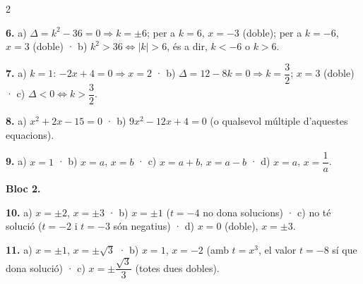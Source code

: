 \documentclass[13pt,a4paper]{extarticle}
\begin{document}
\begin{multicols}{2}
\begin{minipage}{\linewidth}
\textbf{6.} a) $\Delta=k^2-36=0 \Rightarrow k=\pm6$; per a $k=6$, $x=-3$ (doble); per a $k=-6$, $x=3$ (doble) · b) $k^2>36 \Leftrightarrow |k|>6$, és a dir, $k<-6$ o $k>6$.\par
\end{minipage}\par\vspace{1.6mm}
\par\noindent\begin{minipage}{\linewidth}
\textbf{7.} a) $k=1$: $-2x+4=0 \Rightarrow x=2$ · b) $\Delta=12-8k=0 \Rightarrow k=\dfrac32$; $x=3$ (doble) · c) $\Delta<0 \Leftrightarrow k>\dfrac32$.\par
\end{minipage}\par\vspace{1.6mm}
\par\noindent\begin{minipage}{\linewidth}
\textbf{8.} a) $x^2+2x-15=0$ · b) $9x^2-12x+4=0$ (o qualsevol múltiple d'aquestes equacions).\par
\end{minipage}\par\vspace{1.6mm}
\par\noindent\begin{minipage}{\linewidth}
\textbf{9.} a) $x=1$ · b) $x=a$, $x=b$ · c) $x=a+b$, $x=a-b$ · d) $x=a$, $x=\dfrac1a$.\par
\end{minipage}\par\vspace{1.6mm}
\textbf{Bloc 2.}\par
\par\noindent\begin{minipage}{\linewidth}
\textbf{10.} a) $x=\pm2$, $x=\pm3$ · b) $x=\pm1$ ($t=-4$ no dona solucions) · c) no té solució ($t=-2$ i $t=-3$ són negatius) · d) $x=0$ (doble), $x=\pm3$.\par
\end{minipage}\par\vspace{1.6mm}
\par\noindent\begin{minipage}{\linewidth}
\textbf{11.} a) $x=\pm1$, $x=\pm\sqrt3$ · b) $x=1$, $x=-2$ (amb $t=x^3$, el valor $t=-8$ sí que dona solució) · c) $x=\pm\dfrac{\sqrt3}{3}$ (totes dues dobles).\par
\end{minipage}\par\vspace{1.6mm}

\end{multicols}
\end{document}
